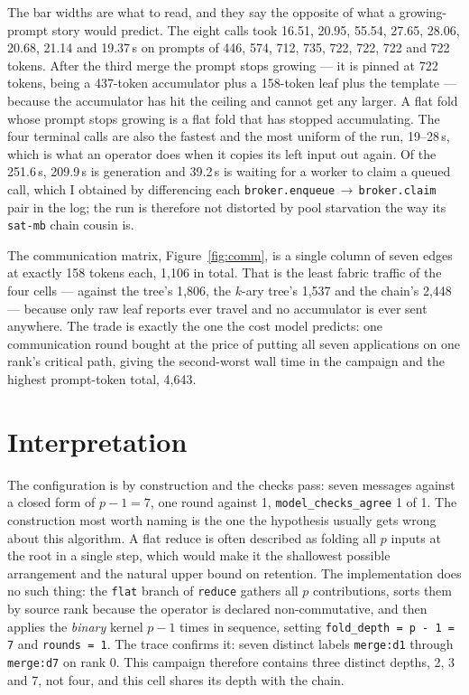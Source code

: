 \documentclass[11pt]{article}
\begin{document}
The bar widths are what to read, and they say the opposite of what a growing-prompt story
would predict. The eight calls took 16.51, 20.95, 55.54, 27.65, 28.06, 20.68, 21.14 and
19.37\,s on prompts of 446, 574, 712, 735, 722, 722, 722 and 722 tokens. After the third
merge the prompt stops growing --- it is pinned at 722 tokens, being a 437-token
accumulator plus a 158-token leaf plus the template --- because the accumulator has hit
the ceiling and cannot get any larger. A flat fold whose prompt stops growing is a flat
fold that has stopped accumulating. The four terminal calls are also the fastest and the
most uniform of the run, 19--28\,s, which is what an operator does when it copies its left
input out again. Of the 251.6\,s, 209.9\,s is generation and 39.2\,s is waiting for a
worker to claim a queued call, which I obtained by differencing each
\texttt{broker.enqueue}\,$\to$\,\texttt{broker.claim} pair in the log; the run is
therefore not distorted by pool starvation the way its \texttt{sat-mb} chain cousin is.

The communication matrix, Figure~\ref{fig:comm}, is a single column of seven edges at
exactly 158 tokens each, 1{,}106 in total. That is the least fabric traffic of the four
cells --- against the tree's 1{,}806, the $k$-ary tree's 1{,}537 and the chain's 2{,}448
--- because only raw leaf reports ever travel and no accumulator is ever sent anywhere.
The trade is exactly the one the cost model predicts: one communication round bought at
the price of putting all seven applications on one rank's critical path, giving the
second-worst wall time in the campaign and the highest prompt-token total, 4{,}643.

\section{Interpretation}

The configuration is by construction and the checks pass: seven messages against a closed
form of $p-1=7$, one round against 1, \texttt{model\_checks\_agree} 1 of 1. The
construction most worth naming is the one the hypothesis usually gets wrong about this
algorithm. A flat reduce is often described as folding all $p$ inputs at the root in a
single step, which would make it the shallowest possible arrangement and the natural
upper bound on retention. The implementation does no such thing: the \texttt{flat} branch
of \texttt{reduce} gathers all $p$ contributions, sorts them by source rank because the
operator is declared non-commutative, and then applies the \emph{binary} kernel $p-1$
times in sequence, setting \texttt{fold\_depth = p - 1 = 7} and \texttt{rounds = 1}. The
trace confirms it: seven distinct labels \texttt{merge:d1} through \texttt{merge:d7} on
rank 0. This campaign therefore contains three distinct depths, 2, 3 and 7, not four, and
this cell shares its depth with the chain.
\end{document}
